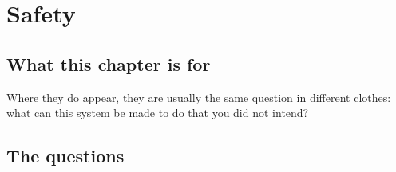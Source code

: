 \chapter{Safety}
\label{ch:safety}

\section*{What this chapter is for}

 Where they do appear, they are usually the same question
in different clothes: what can this system be made to do that you did not
intend?

\section*{The questions}

